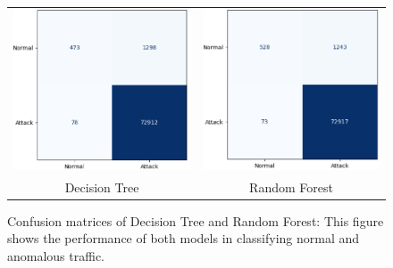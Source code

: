\documentclass[preprint,12pt,authoryear]{elsarticle}
\begin{document}
\begin{figure}[H]
    \centering
    \begin{tabular}{cc}
        \includegraphics[width=0.5\linewidth]{Decision tree.png} &
        \includegraphics[width=0.5\linewidth]{Random Forest.png} \\
        \small Decision Tree & \small Random Forest
    \end{tabular}
    \caption{Confusion matrices of Decision Tree and Random Forest:
This figure shows the performance of both models in classifying normal and anomalous traffic.}
    \label{fig:confusion_matrices_tree_forest}
\end{figure}
\end{document}
